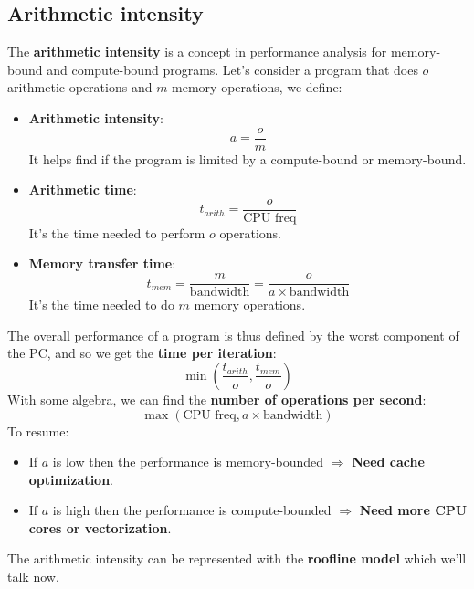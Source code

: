 \documentclass[12pt, openany]{report}
\theoremstyle{definition}
\begin{document}
\subsection{Arithmetic intensity}
The \textbf{arithmetic intensity} is a concept in performance analysis for memory-bound and compute-bound programs.
Let's consider a program that does $o$ arithmetic operations and $m$ memory operations, we define:
\begin{itemize}
	\item \textbf{Arithmetic intensity}: 
	\begin{equation} 
		a = \frac{o}{m}
	\end{equation}
	It helps find if the program is limited by a compute-bound or memory-bound.
	\item \textbf{Arithmetic time}: 
	\begin{equation} 
		t_{arith} = \frac{o}{\text{CPU freq}}
	\end{equation}
	It's the time needed to perform $o$ operations.
	\item \textbf{Memory transfer time}:
	\begin{equation} 
		t_{mem} = \frac{m}{\text{bandwidth}} = \frac{o}{a \times \text{bandwidth}}
	\end{equation}
	It's the time needed to do $m$ memory operations. 
\end{itemize}
The overall performance of a program is thus defined by the worst component of the PC, and so we get the \textbf{time per iteration}:
\begin{equation}
	\min \left( \frac{t_{arith}}{o},\frac{t_{mem}}{o} \right)
\end{equation}
With some algebra, we can find the \textbf{number of operations per second}:
\begin{equation}
	\max \left( \text{CPU freq}, a \times \text{bandwidth} \right)
\end{equation}
To resume:
\begin{itemize}
	\item If $a$ is low then the performance is memory-bounded $\Rightarrow$ \textbf{Need cache optimization}.
	\item If $a$ is high then the performance is compute-bounded $\Rightarrow$ \textbf{Need more CPU cores or vectorization}.
\end{itemize}
The arithmetic intensity can be represented with the \textbf{roofline model} which we'll talk now.
\newpage
\end{document}

